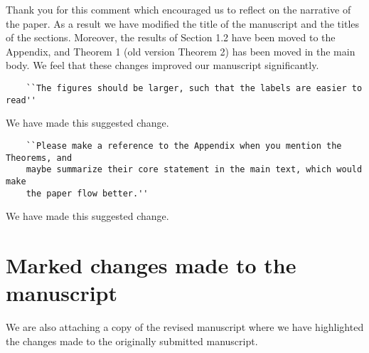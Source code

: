 \documentclass{article}
\begin{document}
Thank you for this comment which encouraged us to reflect on the narrative of the
paper. As a result we have modified the title of the manuscript and the titles
of the sections. Moreover, the results of Section 1.2 have been moved to the Appendix,
and Theorem 1 (old version Theorem 2) has been moved in the main body.
We feel that these changes improved our manuscript significantly.

\begin{verbatim}
    ``The figures should be larger, such that the labels are easier to read''
\end{verbatim}

We have made this suggested change.

\begin{verbatim}
    ``Please make a reference to the Appendix when you mention the Theorems, and
    maybe summarize their core statement in the main text, which would make
    the paper flow better.''
\end{verbatim}

We have made this suggested change.

\section{Marked changes made to the manuscript}

We are also attaching a copy of the revised manuscript where we have highlighted
the changes made to the originally submitted manuscript.


\end{document}
